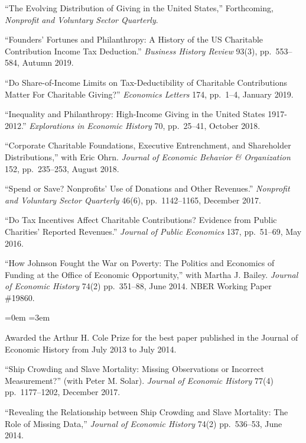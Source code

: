 \documentclass[12pt]{article}
\newenvironment{paperlist}{
	\begin{hangparas}{1em}{1}
	\raggedright \setlength{\parindent}{.3em} \setlength{\parskip}{6pt}
}{
	\end{hangparas}
}
\newenvironment{papercomment}{
	\begin{minipage}[r]{\textwidth}
		\raggedright
		\setlength{\parindent}{2em}
		\parskip=0em
		\hangindent=3em    
		\itshape
			\textbullet \hspace{0.2em} 
}{
	\end{minipage}
	\vspace{-.3em}
}
\begin{document}
\begin{paperlist}

``The Evolving Distribution of Giving in the United States,'' Forthcoming, \textit{Nonprofit} \textit{and Voluntary Sector Quarterly}.

``Founders' Fortunes and Philanthropy: A History of the US Charitable Contribution Income Tax Deduction.''   \textit{Business History Review} 93(3), pp.\ 553--584, Autumn 2019.

``Do Share-of-Income Limits on Tax-Deductibility of Charitable Contributions Matter For Charitable Giving?'' \textit{Economics Letters} 174, pp.\ 1--4, January 2019.

``Inequality and Philanthropy: High-Income Giving in the United States 1917-2012.''  \textit{Explorations in Economic History} 70, pp.\ 25--41, October 2018.

``Corporate Charitable Foundations, Executive Entrenchment, and Shareholder Distributions,'' with Eric Ohrn.  \textit{Journal of Economic Behavior \& Organization} 152, pp.\ 235--253, August 2018.

``Spend or Save? Nonprofits' Use of Donations and Other Revenues.'' \textit{Nonprofit and Voluntary Sector Quarterly}  46(6), pp.\ 1142--1165, December 2017.

``Do Tax Incentives Affect Charitable Contributions? Evidence from Public Charities' Reported Revenues.'' \textit{Journal of Public Economics} 137, pp.\ 51--69, May 2016.

``How Johnson Fought the War on Poverty: The Politics and Economics of Funding at the Office of Economic Opportunity,'' with Martha J. Bailey. \textit{Journal of Economic History} 74(2) pp.\ 351--88, June 2014.  NBER Working Paper \#19860.

	\begin{papercomment}
		Awarded the Arthur H. Cole Prize 
			for the best paper published in 
			the \textnormal{Journal of Economic History} from July 2013 to July 2014.
	\end{papercomment}


``Ship Crowding and Slave Mortality: Missing Observations or Incorrect Measurement?'' (with Peter M. Solar). \textit{Journal of Economic History} 77(4) pp.\ 1177--1202, December 2017.

``Revealing the Relationship between Ship Crowding and Slave Mortality: The Role of Missing Data,'' \textit{Journal of Economic History} 74(2) pp.\ 536--53, June 2014. 

\end{paperlist}
\end{document}
